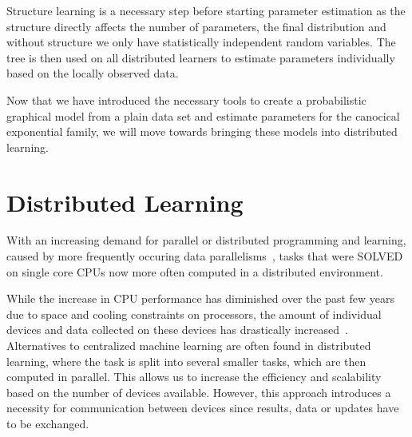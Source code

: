 Structure learning is a necessary step before starting parameter estimation as the structure directly affects the number of parameters, the final distribution and without structure we only have statistically independent random variables. 
The tree is then used on all distributed learners to estimate parameters individually based on the locally observed data. 

Now that we have introduced the necessary tools to create a probabilistic graphical model from a plain data set and estimate parameters for the canocical exponential family, we will move towards bringing these models into distributed learning.


\section{Distributed Learning}
With an increasing demand for parallel or distributed programming and learning, caused by more frequently occuring data parallelisms~\cite{ben2006principles}, tasks that were SOLVED on single core CPUs now more often computed in a distributed environment.

While the increase in CPU performance has diminished over the past few years~\cite{herlihy2011art} due to space and cooling constraints on processors, the amount of individual devices and data collected on these devices has drastically increased~\cite{kaisler2013big}.
Alternatives to centralized machine learning are often found in distributed learning, where the task is split into several smaller tasks, which are then computed in parallel. 
This allows us to increase the efficiency and scalability based on the number of devices available.
However, this approach introduces a necessity for communication between devices since results, data or updates have to be exchanged.

